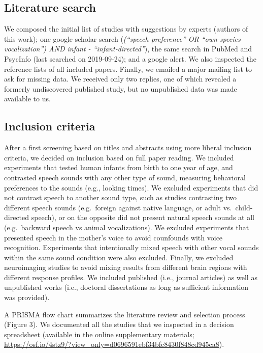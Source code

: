 \documentclass[man]{apa6}
\begin{document}
\subsection{Literature search}\label{literature-search}

We composed the initial list of studies with suggestions by experts
(authors of this work); one google scholar search
(\emph{(\enquote{speech preference} OR \enquote{own-species
vocalization}) AND infant - \enquote{infant-directed}}), the same search
in PubMed and PsycInfo (last searched on 2019-09-24); and a google
alert. We also inspected the reference lists of all included papers.
Finally, we emailed a major mailing list to ask for missing data. We
received only two replies, one of which revealed a formerly undiscovered
published study, but no unpublished data was made available to us.

\subsection{Inclusion criteria}\label{inclusion-criteria}

After a first screening based on titles and abstracts using more liberal
inclusion criteria, we decided on inclusion based on full paper reading.
We included experiments that tested human infants from birth to one year
of age, and contrasted speech sounds with any other type of sound,
measuring behavioral preferences to the sounds (e.g., looking times). We
excluded experiments that did not contrast speech to another sound type,
such as studies contrasting two different speech sounds (e.g.~foreign
against native language, or adult vs.~child-directed speech), or on the
opposite did not present natural speech sounds at all (e.g.~backward
speech vs animal vocalizations). We excluded experiments that presented
speech in the mother's voice to avoid counfounds with voice recognition.
Experiments that intentionally mixed speech with other vocal sounds
within the same sound condition were also excluded. Finally, we excluded
neuroimaging studies to avoid mixing results from different brain
regions with different response profiles. We included published (i.e.,
journal articles) as well as unpublished works (i.e., doctoral
dissertations as long as sufficient information was provided).

A PRISMA flow chart summarizes the literature review and selection
process (Figure 3). We documented all the studies that we inspected in a
decision spreadsheet (available in the online supplementary materials;
\url{https://osf.io/4stz9/?view_only=d0696591ebf34bfc8430f848cd945ca8}).
\end{document}
